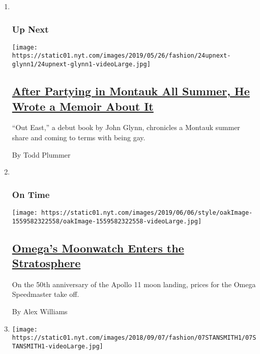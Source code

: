\begin{enumerate}
\def\labelenumi{\arabic{enumi}.}
\item ~
  \hypertarget{up-next-1}{%
  \subsubsection{Up Next}\label{up-next-1}}

  \texttt{[image: https://static01.nyt.com/images/2019/05/26/fashion/24upnext-glynn1/24upnext-glynn1-videoLarge.jpg]}

  \hypertarget{after-partying-in-montauk-all-summer-he-wrote-a-memoir-about-it}{%
  \subsection{\texorpdfstring{\href{/2019/05/24/style/out-east-john-glynn.html}{After
  Partying in Montauk All Summer, He Wrote a Memoir About
  It}}{After Partying in Montauk All Summer, He Wrote a Memoir About It}}\label{after-partying-in-montauk-all-summer-he-wrote-a-memoir-about-it}}

  ``Out East,'' a debut book by John Glynn, chronicles a Montauk summer
  share and coming to terms with being gay.

  By Todd Plummer
\item ~
  \hypertarget{on-time}{%
  \subsubsection{On Time}\label{on-time}}

  \texttt{[image: https://static01.nyt.com/images/2019/06/06/style/oakImage-1559582322558/oakImage-1559582322558-videoLarge.jpg]}

  \hypertarget{omegas-moonwatch-enters-the-stratosphere}{%
  \subsection{\texorpdfstring{\href{/2019/06/05/style/omega-moonwatch.html}{Omega's
  Moonwatch Enters the
  Stratosphere}}{Omega's Moonwatch Enters the Stratosphere}}\label{omegas-moonwatch-enters-the-stratosphere}}

  On the 50th anniversary of the Apollo 11 moon landing, prices for the
  Omega Speedmaster take off.

  By Alex Williams
\item
  \texttt{[image: https://static01.nyt.com/images/2018/09/07/fashion/07STANSMITH1/07STANSMITH1-videoLarge.jpg]}


\end{enumerate}
